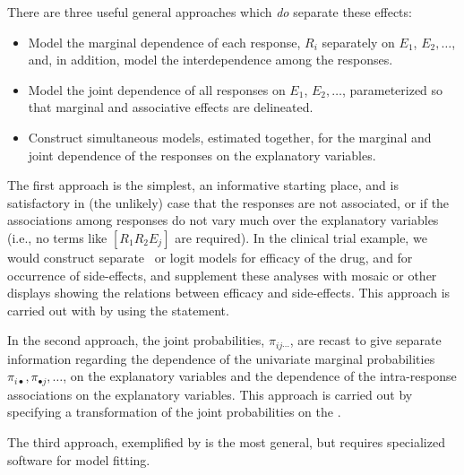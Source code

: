 There are three useful general approaches which \emph{do} separate these effects:
\begin{itemize}
\item Model the marginal dependence of each response, $R_i$ separately on $E_1$, $E_2, \dots$,
and, in addition, model the interdependence among the responses.
\item Model the joint dependence of all responses on $E_1$, $E_2, \dots$,
parameterized so that marginal and associative effects are delineated.
\item Construct simultaneous models, estimated together, for the
marginal and joint dependence of the responses on the explanatory variables.
\end{itemize}

The first approach is the simplest, an informative starting place,
and is satisfactory in (the unlikely) case that the responses
are not associated, or if the associations among responses do not vary much
over the explanatory variables (i.e., no terms like $[R_1 R_2 E_j]$ are
required).  In the clinical trial example, we would construct separate
\loglin\ or logit models for efficacy of the drug, and for occurrence
of side-effects, and supplement these analyses with mosaic or other
displays showing the relations between efficacy and side-effects.
This approach is carried out with  by
using the  statement.

In the second approach, the joint probabilities,  $\pi_{ij\cdots}$,
are recast to give separate information regarding the
dependence of the univariate marginal probabilities
$\pi_{i\bullet}, \pi_{\bullet j}, \dots$,
on the explanatory variables
and the dependence of the intra-response associations on
the explanatory variables.
This approach is carried out by specifying a transformation
of the joint probabilities on the .

The third approach, exemplified by \citet{LangAgresti:94}
is the most general, but requires specialized software
for model fitting.

